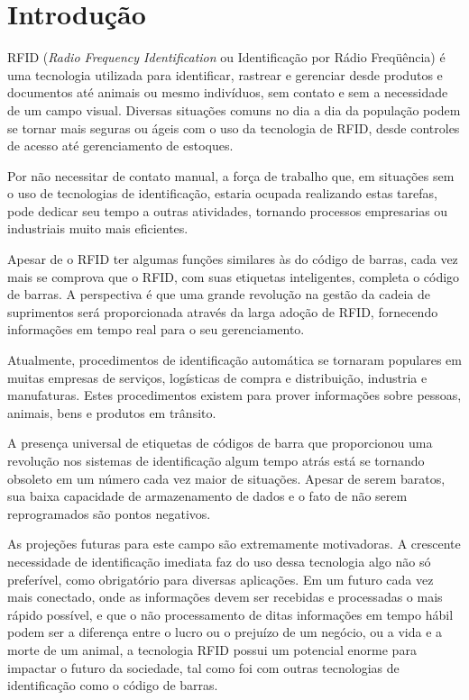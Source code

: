 
\chapter{Introdução}

RFID (\textit{Radio Frequency Identification} ou Identificação por Rádio Freqüência) é uma tecnologia utilizada para identificar, rastrear e gerenciar desde produtos e documentos até animais ou mesmo indivíduos, sem contato e sem a necessidade de um campo visual.\cite{coe} Diversas situações comuns no dia a dia da população podem se tornar mais seguras ou ágeis com o uso da tecnologia de RFID, desde controles de acesso até gerenciamento de estoques.

Por não necessitar de contato manual, a força de trabalho que, em situações sem o uso de tecnologias de identificação, estaria ocupada realizando estas tarefas, pode dedicar seu tempo a outras atividades, tornando processos empresarias ou industriais muito mais eficientes.

Apesar de o RFID ter algumas funções similares às do código de barras, cada vez mais se comprova que o RFID, com suas etiquetas inteligentes, completa o código de barras. A perspectiva é que uma grande revolução na gestão da cadeia de suprimentos será proporcionada através da larga adoção de RFID, fornecendo informações em tempo real para o seu gerenciamento.\cite{coe}

Atualmente, procedimentos de identificação automática se tornaram populares em muitas empresas de serviços, logísticas de compra e distribuição, industria e manufaturas. Estes procedimentos existem para prover informações sobre pessoas, animais, bens e produtos em trânsito. \cite{Fink}

A presença universal de etiquetas de códigos de barra que proporcionou uma revolução nos sistemas de identificação algum tempo atrás está se tornando obsoleto em um número cada vez maior de situações. Apesar de serem baratos, sua baixa capacidade de armazenamento de dados e o fato de não serem reprogramados são pontos negativos. \cite{Fink}

As projeções futuras para este campo são extremamente motivadoras. A crescente necessidade de identificação imediata faz do uso dessa tecnologia algo não só preferível, como obrigatório para diversas aplicações.  Em um futuro cada vez mais conectado, onde as informações devem ser recebidas e processadas o mais rápido possível, e que o não processamento de ditas informações em tempo hábil podem ser a diferença entre o lucro ou o prejuízo de um negócio, ou a vida e a morte de um animal, a tecnologia RFID possui um potencial enorme para impactar o futuro da sociedade, tal como foi com outras tecnologias de identificação como o código de barras.

